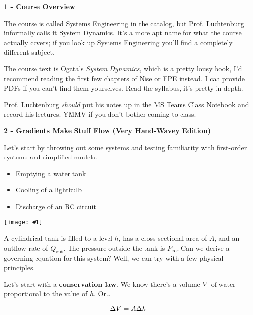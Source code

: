 \documentclass{article}
\newcommand{\bicture}[1]{\begin{center}
    {\texttt{[image: \#1]}}
\end{center}}
\newcommand{\volume}{{\ooalign{\hfil$V$\hfil\cr\kern0.08em--\hfil\cr}}}
\begin{document}
\begin{onehalfspacing}

\begin{flushleft}

\large\textbf{1 - Course Overview} \\
\normalsize

The course is called Systems Engineering in the catalog, but Prof. Luchtenburg informally calls it System Dynamics. It's a more apt name for what the course actually covers; if you look up Systems Engineering you'll find a completely different subject.

\medskip

The course text is Ogata's \textit{System Dynamics}, which is a pretty lousy book, I'd recommend reading the first few chapters of Nise or FPE instead. I can provide PDFs if you can't find them yourselves. Read the syllabus, it's pretty in depth.

\medskip

Prof. Luchtenburg \textit{should} put his notes up in the MS Teams Class Notebook and record his lectures. YMMV if you don't bother coming to class.

\bigskip
\large\textbf{2 - Gradients Make Stuff Flow (Very Hand-Wavey Edition)} \\
\normalsize

Let's start by throwing out some systems and testing familiarity with first-order systems and simplified models.
\begin{itemize}[noitemsep,topsep=0.5pt]
    \item Emptying a water tank
    \item Cooling of a lightbulb
    \item Discharge of an RC circuit
\end{itemize}

\bicture{1_sys1}

A cylindrical tank is filled to a level \(h\), has a cross-sectional area of \(A\), and an outflow rate of \(Q_\text{out}\). The pressure outside the tank is \(P_{\infty}\). Can we derive a governing equation for this system? Well, we can try with a few physical principles.

\medskip

Let's start with a \textbf{conservation law}. We know there's a volume \(\volume\) of water proportional to the value of \(h\). Or\dots

\vspace{-0.1in}
\[\Delta \volume = A \Delta h\]


\end{flushleft}
\end{onehalfspacing}
\end{document}
